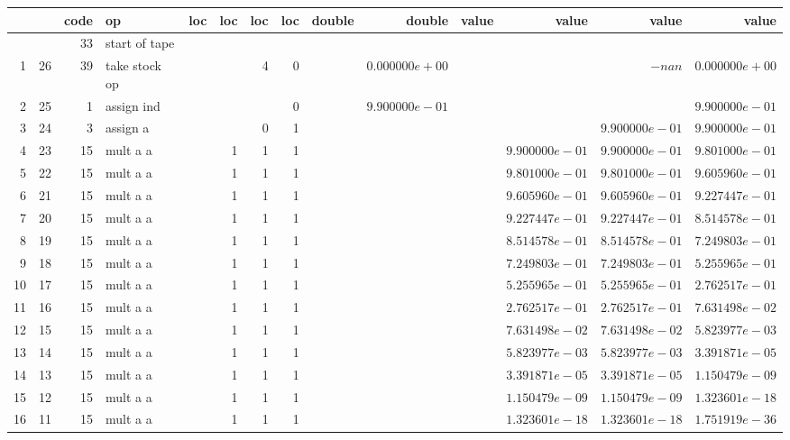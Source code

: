 \documentclass{article}
\begin{document}
\tiny
\begin{tabular}{|r|r|r|l|r|r|r|r||r|r||r|r|r|r|} \hline 
 & & code & op & loc & loc & loc & loc & double & double & value & value & value & value \\ \hline 
 & & 33 & start of tape & & & & & & & & & &  \\ \hline 
1 & 26 & 39 & take stock op & & & 4 & 0 & &$ 0.000000e+00 $& & &$ -nan $&$ 0.000000e+00 $\\ \hline 
2 & 25 & 1 & assign ind & & & & 0 & &$ 9.900000e-01 $& & & &$ 9.900000e-01 $\\ \hline 
3 & 24 & 3 & assign a & & & 0 & 1 & & & & &$ 9.900000e-01 $&$ 9.900000e-01 $\\ \hline 
4 & 23 & 15 & mult a a & & 1 & 1 & 1 & & & &$ 9.900000e-01 $&$ 9.900000e-01 $&$ 9.801000e-01 $\\ \hline 
5 & 22 & 15 & mult a a & & 1 & 1 & 1 & & & &$ 9.801000e-01 $&$ 9.801000e-01 $&$ 9.605960e-01 $\\ \hline 
6 & 21 & 15 & mult a a & & 1 & 1 & 1 & & & &$ 9.605960e-01 $&$ 9.605960e-01 $&$ 9.227447e-01 $\\ \hline 
7 & 20 & 15 & mult a a & & 1 & 1 & 1 & & & &$ 9.227447e-01 $&$ 9.227447e-01 $&$ 8.514578e-01 $\\ \hline 
8 & 19 & 15 & mult a a & & 1 & 1 & 1 & & & &$ 8.514578e-01 $&$ 8.514578e-01 $&$ 7.249803e-01 $\\ \hline 
9 & 18 & 15 & mult a a & & 1 & 1 & 1 & & & &$ 7.249803e-01 $&$ 7.249803e-01 $&$ 5.255965e-01 $\\ \hline 
10 & 17 & 15 & mult a a & & 1 & 1 & 1 & & & &$ 5.255965e-01 $&$ 5.255965e-01 $&$ 2.762517e-01 $\\ \hline 
11 & 16 & 15 & mult a a & & 1 & 1 & 1 & & & &$ 2.762517e-01 $&$ 2.762517e-01 $&$ 7.631498e-02 $\\ \hline 
12 & 15 & 15 & mult a a & & 1 & 1 & 1 & & & &$ 7.631498e-02 $&$ 7.631498e-02 $&$ 5.823977e-03 $\\ \hline 
13 & 14 & 15 & mult a a & & 1 & 1 & 1 & & & &$ 5.823977e-03 $&$ 5.823977e-03 $&$ 3.391871e-05 $\\ \hline 
14 & 13 & 15 & mult a a & & 1 & 1 & 1 & & & &$ 3.391871e-05 $&$ 3.391871e-05 $&$ 1.150479e-09 $\\ \hline 
15 & 12 & 15 & mult a a & & 1 & 1 & 1 & & & &$ 1.150479e-09 $&$ 1.150479e-09 $&$ 1.323601e-18 $\\ \hline 
16 & 11 & 15 & mult a a & & 1 & 1 & 1 & & & &$ 1.323601e-18 $&$ 1.323601e-18 $&$ 1.751919e-36 $\\ \hline 

\end{tabular}
\end{document}
